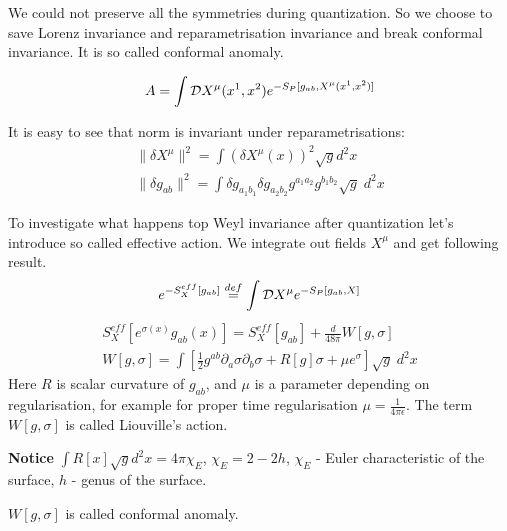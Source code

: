 \documentclass[a4paper,12pt]{article}
\theoremstyle{definition} \newtheorem{Def}{Definition}
\begin{document}
We could not preserve all the symmetries during quantization. So we choose to save Lorenz invariance and reparametrisation invariance and break conformal invariance. It is so called conformal anomaly.

\begin{equation}
  \label{eq:10}
  A=\int {\cal D}X^{\mu}(x^1,x^2)e^{-S_P[g_{ab},X^{\mu}(x^1,x^2)]}
\end{equation}

It is easy to see that norm is invariant under reparametrisations:
\begin{equation}
  \label{eq:11}
  \begin{split}
    \|\delta X^{\mu}\|^2 = \int \left(\delta X^{\mu}(x)\right)^2 \sqrt{g} d^2x\\
    \|\delta g_{ab}\|^2 = \int \delta g_{a_1 b_1}\delta g_{a_2 b_2} g^{a_1 a_2} g^{b_1 b_2} \sqrt{g}\; d^2x
  \end{split}
\end{equation}

To investigate what happens top Weyl invariance after quantization let's introduce so called effective action. We integrate out fields $X^{\mu}$ and get following result.
\begin{equation}
  \label{eq:12}
  e^{-S_X^{eff}[g_{ab}]} \overset{def}{=} \int {\cal D}X^{\mu} e^{-S_P [g_{ab},X]}
\end{equation}
\begin{equation}
  \label{eq:13}
  \begin{split}
    S^{eff}_X [e^{\sigma(x)} g_{ab}(x) ] = S_X^{eff}[g_{ab}]+\frac{d}{48\pi}W[g,\sigma]\\
    W[g,\sigma]=\int \left[ \frac{1}{2} g^{ab}\partial_a\sigma \partial_b\sigma+R[g]\sigma+\mu e^{\sigma}\right] \sqrt{g}\; d^2x
  \end{split}
\end{equation}
Here $R$ is scalar curvature of $g_{ab}$, and $\mu$ is a parameter depending on regularisation, for example for proper time regularisation $\mu=\frac{1}{4\pi\epsilon}$. The term $W[g,\sigma]$ is called Liouville's action.

{\bf Notice} $\int R[x] \sqrt{g}d^2x = 4\pi \chi_E$, $\chi_E=2-2h$, $\chi_E$ - Euler characteristic of the surface, $h$ - genus of the surface.

$W[g,\sigma]$  is called conformal anomaly.
\end{document}
